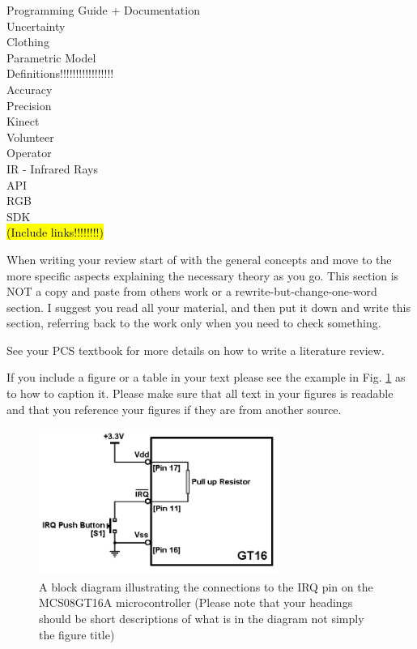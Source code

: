 Programming Guide + Documentation\\
Uncertainty\\
Clothing\\
Parametric Model\\

Definitions!!!!!!!!!!!!!!!!!\\
Accuracy\\
Precision\\
Kinect\\
Volunteer\\
Operator\\
IR - Infrared Rays\\
API\\
RGB\\
SDK\\

\hl{(Include links!!!!!!!!)}

When writing your review start of with the general concepts and move to the more specific aspects
explaining the necessary theory as you go. This section is NOT a copy and paste from others work or a
rewrite-but-change-one-word section. I suggest you read all your material, and then put it down and
write this section, referring back to the work only when you need to check something.

See your PCS textbook for more details on how to write a literature review.

If you include a figure or a table in your text please see the example in Fig. \ref{fig:model} as to how to caption it.
Please make sure that all text in your figures is readable and that you reference your figures if they are
from another source.

\begin{figure}[ht]
\centering
\includegraphics[width=0.7\textwidth]{model.png}
\caption{A block diagram illustrating the connections to the IRQ pin on the MCS08GT16A microcontroller (Please
note that your headings should be short descriptions of what is in the diagram not simply the figure title)}
\label{fig:model}
\end{figure}

